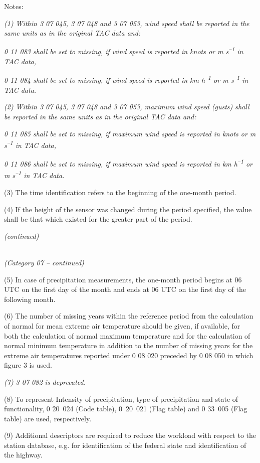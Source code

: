Notes:

\emph{(1) Within 3 07 045, 3 07 048 and 3 07 053, wind speed shall be reported in the same units as in the original TAC data and:}

\emph{0 11 083 shall be set to missing, if wind speed is reported in knots or m s\textsuperscript{--1} in TAC data,}

\emph{0 11 084 shall be set to missing, if wind speed is reported in km h\textsuperscript{--1} or m s\textsuperscript{--1} in TAC data.}

\emph{(2) Within 3 07 045, 3 07 048 and 3 07 053, maximum wind speed (gusts) shall be reported in the same units as in the original TAC data and:}

\emph{0 11 085 shall be set to missing, if maximum wind speed is reported in knots or m s\textsuperscript{--1} in TAC data,}

\emph{0 11 086 shall be set to missing, if maximum wind speed is reported in km h\textsuperscript{--1} or m s\textsuperscript{--1} in TAC data.}

(3) The time identification refers to the beginning of the one-month period.

(4) If the height of the sensor was changed during the period specified, the value shall be that which existed for the greater part of the period.

\emph{(continued)}

\emph{\\
(Category 07 -- continued)}

(5) In case of precipitation measurements, the one-month period begins at 06 UTC on the first day of the month and ends at 06 UTC on the first day of the following month.

(6) The number of missing years within the reference period from the calculation of normal for mean extreme air temperature should be given, if available, for both the calculation of normal maximum temperature and for the calculation of normal minimum temperature in addition to the number of missing years for the extreme air temperatures reported under 0 08 020 preceded by 0 08 050 in which figure 3 is used.

\emph{(7) 3 07 082 is deprecated.}

(8) To represent Intensity of precipitation, type of precipitation and state of functionality, 0 20~024 (Code table), 0~20~021 (Flag table) and 0 33~005 (Flag table) are used, respectively.

(9) Additional descriptors are required to reduce the workload with respect to the station database, e.g. for identification of the federal state and identification of the highway.

